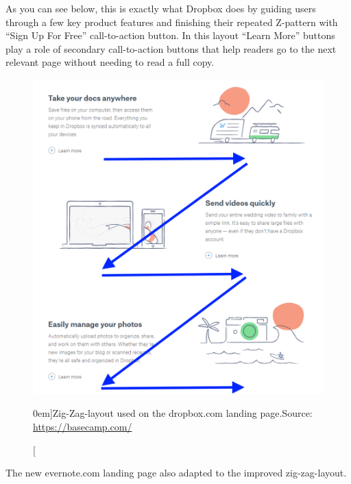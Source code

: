 As you can see below, this is exactly what Dropbox does by guiding users through a few key product features and finishing their repeated Z-pattern with “Sign Up For Free” call-to-action button. In this layout “Learn More” buttons play a role of secondary call-to-action buttons that help readers go to the next relevant page without needing to read a full copy.

\begin{figure}%
  \includegraphics[width=1.0\textwidth]{../figures/zig-zag_dropbox.png}
  \caption[][0em]{Zig-Zag-layout used on the dropbox.com landing page.\newline Source: \url{https://basecamp.com/}}
  \label{fig:z-shape_facebook}
\end{figure}

The new evernote.com landing page also adapted to the improved zig-zag-layout.

